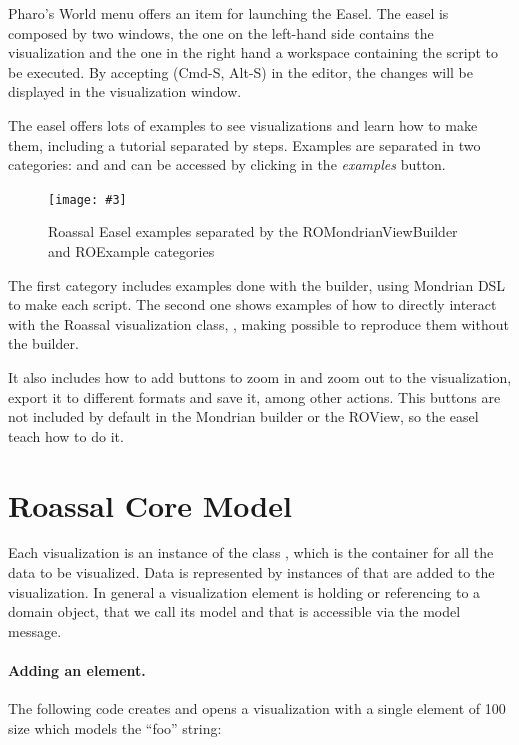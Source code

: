 \documentclass[a4paper,10pt,twoside]{book}
\newcommand{\fig}[4]{
		\begin{figure}[#1]
			\centering
			\texttt{[image: \#3]}
			\caption{\label{fig:#3}#4}
		\end{figure}}
\begin{document}
Pharo's World menu offers an item for launching the Easel. The easel is composed by two windows, the one on the left-hand side contains the visualization and the one in the right hand a workspace containing the script to be executed. By accepting (Cmd-S, Alt-S) in the editor, the changes will be displayed in the visualization window.

The easel offers lots of examples to see visualizations and learn how to make them, including a tutorial separated by steps. Examples are separated in two categories:  and  and can be accessed by clicking in the \textit{examples} button.

\fig{H}{1}{ROEasel}{Roassal Easel examples separated by the ROMondrianViewBuilder and ROExample categories}


The first category includes examples done with the builder, using Mondrian DSL to make each script. The second one shows examples of how to directly interact with the Roassal visualization class, , making possible to reproduce them without the builder.

It also includes how to add buttons to zoom in and zoom out to the visualization, export it to different formats and save it, among other actions. This buttons are not included by default in the Mondrian builder or the ROView, so the easel teach how to do it.



\section{Roassal Core Model}



Each visualization is an instance of the class , which is the container for all the data to be visualized.
Data is represented by instances of  that are added to the visualization. In general a visualization element is holding or referencing to a domain object, that we call its model and that is accessible via the model message. 

\paragraph{Adding an element.} The following code creates and opens a visualization with a single element of 100 size which models the ``foo'' string:
\end{document}
